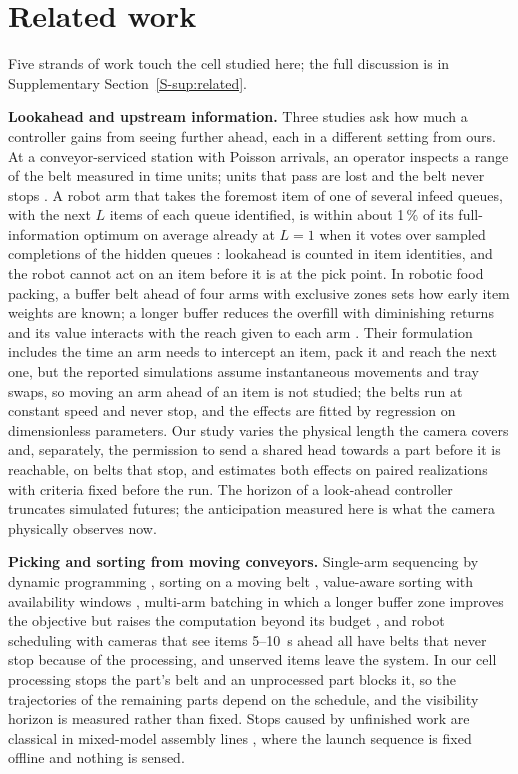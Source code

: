 \documentclass[11pt,a4paper]{article}
\newcommand{\supsec}[1]{Supplementary Section~\ref{S-#1}}
\begin{document}
\section{Related work}\label{sec:related}
Five strands of work touch the cell studied here; the full discussion is in
\supsec{sup:related}.

\textbf{Lookahead and upstream information.} Three studies ask how much a controller gains
from seeing further ahead, each in a different setting from ours. At a conveyor-serviced
station with Poisson arrivals, an operator inspects a range of the belt measured in time
units; units that pass are lost and the belt never stops \cite{Nawijn1981}. A robot arm
that takes the foremost item of one of several infeed queues, with the next $L$ items of
each queue identified, is within about 1\,\% of its full-information optimum on average
already at $L=1$ when it votes over sampled completions of the hidden queues
\cite{Li2026}: lookahead is counted in item identities, and the robot cannot act on an
item before it is at the pick point. In robotic food packing, a buffer belt ahead of four
arms with exclusive zones sets how early item weights are known; a longer buffer reduces
the overfill with diminishing returns and its value interacts with the reach given to each
arm \cite{Ladefoged2026}. Their formulation includes the time an arm needs to intercept an
item, pack it and reach the next one, but the reported simulations assume instantaneous
movements and tray swaps, so moving an arm ahead of an item is not studied; the belts run
at constant speed and never stop, and the effects are fitted by regression on
dimensionless parameters. Our study varies the physical length the camera covers and,
separately, the permission to send a shared head towards a part before it is reachable,
on belts that stop, and estimates both effects on paired realizations with criteria fixed
before the run. The horizon of a look-ahead controller \cite{Righettini2025} truncates
simulated futures; the anticipation measured here is what the camera physically observes
now.

\textbf{Picking and sorting from moving conveyors.} Single-arm sequencing by dynamic
programming \cite{S02_Han2020}, sorting on a moving belt \cite{S01_Mattone2000},
value-aware sorting with availability windows \cite{S05_Kokkalis2026}, multi-arm batching
in which a longer buffer zone improves the objective but raises the computation beyond its
budget \cite{S03_Nielsen2023}, and robot scheduling with cameras that see items 5--10~s
ahead \cite{S04_Schettini2023} all have belts that never stop because of the processing,
and unserved items leave the system. In our cell processing stops the part's belt and an
unprocessed part blocks it, so the trajectories of the remaining parts depend on the
schedule, and the visibility horizon is measured rather than fixed. Stops caused by
unfinished work are classical in mixed-model assembly lines \cite{Xiaobo2000,Tamura2011},
where the launch sequence is fixed offline and nothing is sensed.
\end{document}
